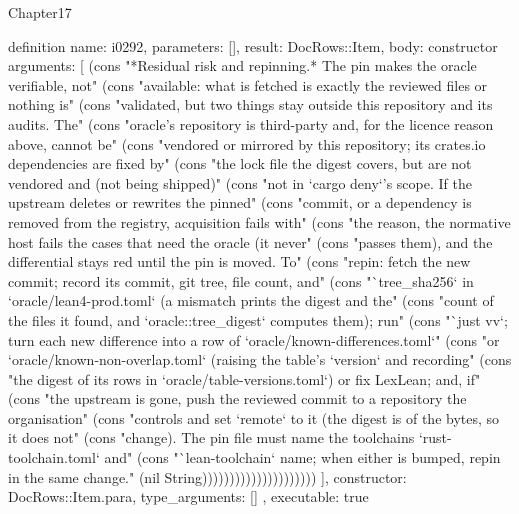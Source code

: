 \begin{lexlean}{Chapter17}
\begin{semanticmodule}
definition{
  name: i0292,
  parameters: [],
  result: DocRows::Item,
  body: constructor{
    arguments: [
      (cons "*Residual risk and repinning.* The pin makes the oracle verifiable, not" (cons "available: what is fetched is exactly the reviewed files or nothing is" (cons "validated, but two things stay outside this repository and its audits. The" (cons "oracle's repository is third-party and, for the licence reason above, cannot be" (cons "vendored or mirrored by this repository; its crates.io dependencies are fixed by" (cons "the lock file the digest covers, but are not vendored and (not being shipped)" (cons "not in `cargo deny`'s scope. If the upstream deletes or rewrites the pinned" (cons "commit, or a dependency is removed from the registry, acquisition fails with" (cons "the reason, the normative host fails the cases that need the oracle (it never" (cons "passes them), and the differential stays red until the pin is moved. To" (cons "repin: fetch the new commit; record its commit, git tree, file count, and" (cons "`tree_sha256` in `oracle/lean4-prod.toml` (a mismatch prints the digest and the" (cons "count of the files it found, and `oracle::tree_digest` computes them); run" (cons "`just vv`; turn each new difference into a row of `oracle/known-differences.toml`" (cons "or `oracle/known-non-overlap.toml` (raising the table's `version` and recording" (cons "the digest of its rows in `oracle/table-versions.toml`) or fix LexLean; and, if" (cons "the upstream is gone, push the reviewed commit to a repository the organisation" (cons "controls and set `remote` to it (the digest is of the bytes, so it does not" (cons "change). The pin file must name the toolchains `rust-toolchain.toml` and" (cons "`lean-toolchain` name; when either is bumped, repin in the same change." (nil String)))))))))))))))))))))
    ],
    constructor: DocRows::Item.para,
    type_arguments: []
  },
  executable: true
}


\end{semanticmodule}
\end{lexlean}
